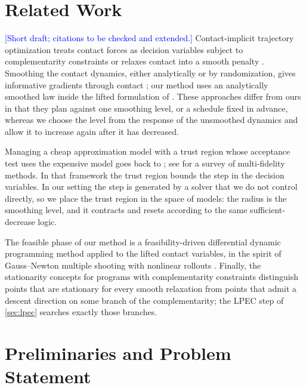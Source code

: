 \documentclass[11pt]{article}
\theoremstyle{remark}
\newcommand{\note}[1]{\textcolor{blue}{[#1]}}
\begin{document}
\section{Related Work}

\note{Short draft; citations to be checked and extended.}
Contact-implicit trajectory optimization treats contact forces as decision variables subject to complementarity constraints \cite{posa2014direct} or relaxes contact into a smooth penalty \cite{mordatch2012discovery}. Smoothing the contact dynamics, either analytically or by randomization, gives informative gradients through contact \cite{suh2022bundled,pang2023global}; our method uses an analytically smoothed law inside the lifted formulation of \cite{li2027lifted}. These approaches differ from ours in that they plan against one smoothing level, or a schedule fixed in advance, whereas we choose the level from the response of the unsmoothed dynamics and allow it to increase again after it has decreased.

Managing a cheap approximation model with a trust region whose acceptance test uses the expensive model goes back to \cite{alexandrov1998trust}; see \cite{peherstorfer2018survey} for a survey of multi-fidelity methods. In that framework the trust region bounds the step in the decision variables. In our setting the step is generated by a solver that we do not control directly, so we place the trust region in the space of models: the radius is the smoothing level, and it contracts and resets according to the same sufficient-decrease logic.

The feasible phase of our method is a feasibility-driven differential dynamic programming method \cite{mastalli2020crocoddyl} applied to the lifted contact variables, in the spirit of Gauss--Newton multiple shooting with nonlinear rollouts \cite{giftthaler2018family}. Finally, the stationarity concepts for programs with complementarity constraints \cite{luo1996mathematical,scheel2000mathematical} distinguish points that are stationary for every smooth relaxation from points that admit a descent direction on some branch of the complementarity; the LPEC step of \cref{sec:lpec} searches exactly those branches.

\section{Preliminaries and Problem Statement}
\label{sec:prelim}
\end{document}
